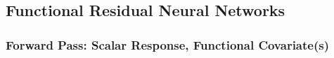 \documentclass{article}
\begin{document}


\subsection{Functional Residual Neural Networks}

\subsubsection{Forward Pass: Scalar Response, Functional Covariate(s)}
\end{document}
